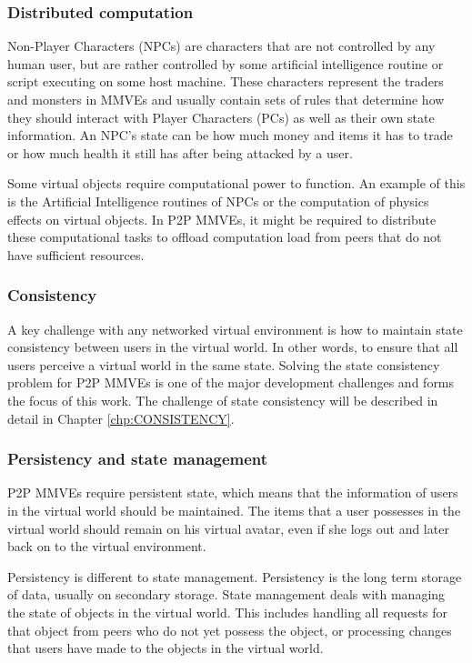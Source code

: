 \subsubsection{Distributed computation}
\label{distributed_computation_requirement}

Non-Player Characters (NPCs) are characters that are not controlled by any human user, but are rather controlled by some artificial intelligence routine or script executing on some host machine. These characters represent the traders and monsters in MMVEs and usually contain sets of rules that determine how they should interact with Player Characters (PCs) as well as their own state information. An NPC's state can be how much money and items it has to trade or how much health it still has after being attacked by a user.

Some virtual objects require computational power to function. An example of this is the Artificial Intelligence routines of NPCs or the computation of physics effects on virtual objects. In P2P MMVEs, it might be required to distribute these computational tasks to offload computation load from peers that do not have sufficient resources.

\subsubsection{Consistency}
A key challenge with any networked virtual environment is how to maintain state consistency between users in the virtual world. In other words, to ensure that all users perceive a virtual world in the same state. Solving the state consistency problem for P2P MMVEs is one of the major development challenges and forms the focus of this work. The challenge of state consistency will be described in detail in Chapter \ref{chp:CONSISTENCY}.

\subsubsection{Persistency and state management}

P2P MMVEs require persistent state, which means that the information of users in the virtual world should be maintained. The items that a user possesses in the virtual world should remain on his virtual avatar, even if she logs out and later back on to the virtual environment.

Persistency is different to state management. Persistency is the long term storage of data, usually on secondary storage. State management deals with managing the state of objects in the virtual world. This includes handling all requests for that object from peers who do not yet possess the object, or processing changes that users have made to the objects in the virtual world.

